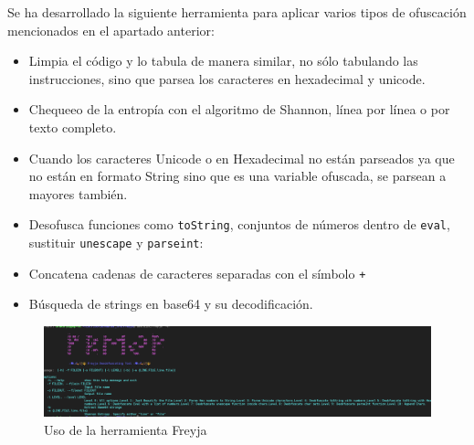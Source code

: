 \documentclass[a4paper]{article}
\begin{document}
	Se ha desarrollado la siguiente herramienta para aplicar varios tipos de ofuscación mencionados en el apartado anterior:
	
	\begin{itemize}
		\item Limpia el código y lo tabula de manera similar, no sólo tabulando las instrucciones, sino que parsea los caracteres en hexadecimal y unicode.
		\item Chequeeo de la entropía con el algoritmo de Shannon, línea por línea o por texto completo.
		\item Cuando los caracteres Unicode o en Hexadecimal no están parseados ya que no están en formato String sino que es una variable ofuscada, se parsean a mayores también.
		\item Desofusca funciones como \verb*|toString|, conjuntos de números dentro de \verb*|eval|, sustituir \verb*|unescape| y \verb*|parseint|:
		\item Concatena cadenas de caracteres separadas con el símbolo \verb*|+|
		\item Búsqueda de strings en base64 y su decodificación.
	\end{itemize}

	\begin{figure}[H]
		\centering
		\includegraphics[width=18cm]{images/usage.png}
		\caption{Uso de la herramienta Freyja}
	\end{figure}
	
\end{document}
